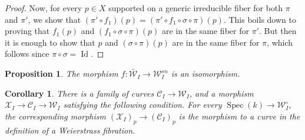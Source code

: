 \documentclass[11pt]{amsart}
\newcommand{\cE}{\mathcal{W}}
\newcommand{\sC}{\mathscr{C}}
\newcommand{\sX}{\mathscr{X}}
\newcommand{\spec}{\operatorname{Spec}}
\newcommand{\Id}{\operatorname{Id}}
\newtheorem{Cor}[theorem]{Corollary}
\newtheorem{Prop}[theorem]{Proposition}
\theoremstyle{definition}
\begin{document}
\begin{proof}
Now, for every $p \in X$ supported on a generic irreducible fiber for both $\pi$ and $\pi'$, we show that $(\pi'\circ f_1)(p)=(\pi' \circ  f_1  \circ \sigma  \circ  \pi) (p)$. This boils down to proving that $f_1(p)$ and $(f_1 \circ \sigma \circ \pi )(p)$ are in the same fiber for $\pi'$. But then it is enough to show that
$p$ and $(\sigma \circ \pi) (p)$ are in the same fiber for $\pi$, which follows since $\pi \circ \sigma = \Id$.
\end{proof}


\begin{Prop}\label{Prop:we:have:the:universal:curve}
 The morphism $f:\widetilde{\cE_I} \to \cE_I^{sn}$ is an isomorphism. 
\end{Prop}
\begin{Cor}\label{Cor:we:have:the:curve}
There is a family of curves $\sC_I \to \cE_I$, and a morphism $\sX_I \to \sC_I \to \cE_I$ satisfying the following condition. For every $\spec(k) \to \cE_I^\circ$, the corresponding morphism $(\sX_I)_p \to (\sC_I)_p$ is the morphism to a curve in the definition of a Weierstrass fibration.
\end{Cor}
\end{document}
